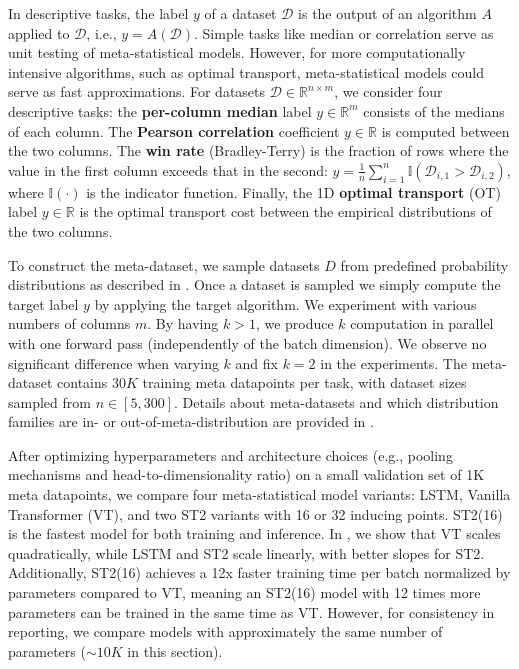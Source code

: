 In descriptive tasks, the label \( y \) of a dataset \( \mathcal{D} \) is the output of an algorithm \( A \) applied to \( \mathcal{D} \), i.e., \( y = A(\mathcal{D}) \). Simple tasks like median or correlation serve as unit testing of meta-statistical models. However, for more computationally intensive algorithms, such as optimal transport, meta-statistical models could serve as fast approximations. For datasets \( \mathcal{D} \in \mathbb{R}^{n \times m} \), we consider four descriptive tasks: the \textbf{per-column median} label \( y \in \mathbb{R}^m \) consists of the medians of each column. The \textbf{Pearson correlation} coefficient \( y \in \mathbb{R} \) is computed between the two columns. The \textbf{win rate} (Bradley-Terry) is the fraction of rows where the value in the first column exceeds that in the second: \( y = \frac{1}{n} \sum_{i=1}^n \mathbb{I}(\mathcal{D}_{i,1} > \mathcal{D}_{i,2})\), where \( \mathbb{I}(\cdot) \) is the indicator function. Finally, the 1D \textbf{optimal transport} (OT) label \( y \in \mathbb{R} \) is the optimal transport cost between the empirical distributions of the two columns.


To construct the meta-dataset, we sample datasets \( D \) from predefined probability distributions as described in . Once a dataset is sampled we simply compute the target label \( y \) by applying the target algorithm. We experiment with various numbers of columns $m$. By having $k > 1$, we produce $k$ computation in parallel with one forward pass (independently of the batch dimension). We observe no significant difference when varying $k$ and fix $k=2$ in the experiments. The meta-dataset contains $30K$ training meta datapoints per task, with dataset sizes sampled from $n \in [5, 300]$. Details about meta-datasets and which distribution families are in- or out-of-meta-distribution are provided in .


After optimizing hyperparameters and architecture choices (e.g., pooling mechanisms and head-to-dimensionality ratio) on a small validation set of 1K meta datapoints, we compare four meta-statistical model variants: LSTM, Vanilla Transformer (VT), and two ST2 variants with 16 or 32 inducing points. ST2(16) is the fastest model for both training and inference. In , we show that VT scales quadratically, while LSTM and ST2 scale linearly, with better slopes for ST2. Additionally, ST2(16) achieves a 12x faster training time per batch normalized by parameters compared to VT, meaning an ST2(16) model with 12 times more parameters can be trained in the same time as VT. However, for consistency in reporting, we compare models with approximately the same number of parameters (\( \sim 10K \) in this section).



